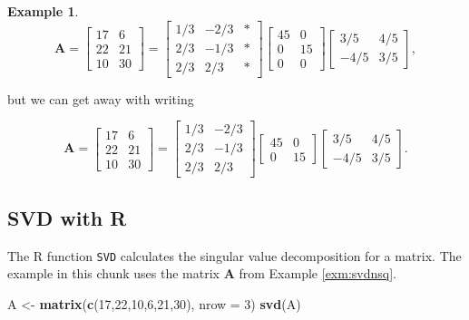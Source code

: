 \documentclass[
]{book}
\newenvironment{Shaded}{\begin{snugshade}}{\end{snugshade}}
\newcommand{\AttributeTok}[1]{\textcolor[rgb]{0.13,0.29,0.53}{#1}}
\newcommand{\DecValTok}[1]{\textcolor[rgb]{0.00,0.00,0.81}{#1}}
\newcommand{\FunctionTok}[1]{\textcolor[rgb]{0.13,0.29,0.53}{\textbf{#1}}}
\newcommand{\NormalTok}[1]{#1}
\newcommand{\OtherTok}[1]{\textcolor[rgb]{0.56,0.35,0.01}{#1}}
\theoremstyle{definition}
\theoremstyle{definition}
\newtheorem{example}{Example}[chapter]
\theoremstyle{definition}
\theoremstyle{definition}
\theoremstyle{remark}
\begin{document}
\begin{examplebox}
\begin{example}
\[\mathbf{A}=\begin{bmatrix} 17 & 6\\22 & 21\\10 & 30\end{bmatrix}=\begin{bmatrix} 1/3 & -2/3 & *\\2/3 & -1/3 & *\\2/3 & 2/3 & *\end{bmatrix}\begin{bmatrix}45 & 0\\0 & 15 \\0 & 0\end{bmatrix} \begin{bmatrix}3/5 & 4/5\\-4/5 & 3/5\end{bmatrix},\]

but we can get away with writing

\[\mathbf{A}=\begin{bmatrix} 17 & 6\\22 & 21\\10 & 30\end{bmatrix}=\begin{bmatrix} 1/3 & -2/3 \\2/3 & -1/3 \\2/3 & 2/3 \end{bmatrix}\begin{bmatrix}45 & 0\\0 & 15\end{bmatrix} \begin{bmatrix}3/5 & 4/5\\-4/5 & 3/5\end{bmatrix}.\]
\end{example}

\end{examplebox}

\subsection*{SVD with R}\label{svd-with-r}

The R function \texttt{SVD} calculates the singular value decomposition for a matrix. The example in this chunk uses the matrix \(\mathbf{A}\) from Example \ref{exm:svdnsq}.

\begin{Shaded}
\begin{Highlighting}[]
\NormalTok{A }\OtherTok{\textless{}{-}} \FunctionTok{matrix}\NormalTok{(}\FunctionTok{c}\NormalTok{(}\DecValTok{17}\NormalTok{,}\DecValTok{22}\NormalTok{,}\DecValTok{10}\NormalTok{,}\DecValTok{6}\NormalTok{,}\DecValTok{21}\NormalTok{,}\DecValTok{30}\NormalTok{), }\AttributeTok{nrow =} \DecValTok{3}\NormalTok{)}
\FunctionTok{svd}\NormalTok{(A)}
\end{Highlighting}
\end{Shaded}
\end{document}
